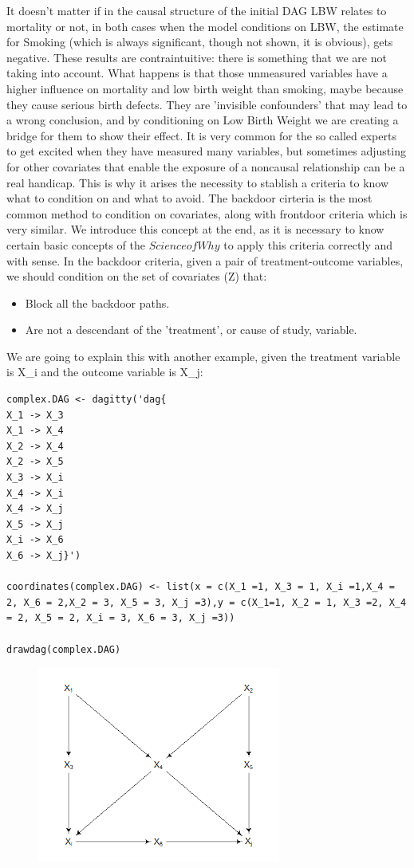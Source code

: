 \documentclass{article}
\begin{document}
It doesn't matter if in the causal structure of the initial DAG LBW relates to mortality or not, in both cases when the model conditions on LBW, the estimate for Smoking (which is always significant, though not shown, it is obvious), gets negative. These results are contraintuitive: there is something that we are not taking into account. 
What happens is that those unmeasured variables have a higher influence on mortality and low birth weight than smoking, maybe because they cause serious birth defects. They are 'invisible confounders' that may lead to a wrong conclusion, and by conditioning on Low Birth Weight we are creating a bridge for them to show their effect.
It is very common for the so called experts to get excited when they have measured many variables, but sometimes adjusting for other covariates that enable the exposure of a non\-causal relationship can be a real handicap. This is why it arises the necessity to stablish a criteria to know what to condition on and what to avoid.
The backdoor cirteria is the most common method to condition on covariates, along with frontdoor criteria which is very similar.
We introduce this concept at the end, as it is necessary to know certain basic concepts of the \(Science of Why\) to apply this criteria correctly and with sense.
In the backdoor criteria, given a pair of treatment-outcome variables, we should condition on the set of covariates (Z) that:
\begin{itemize} \item Block all the backdoor paths. \item Are not a descendant of the 'treatment', or cause of study, variable.\end{itemize}
We are going to explain this with another example, given the treatment variable is X\_i and the outcome variable is X\_j:
\begin{lstlisting}
complex.DAG <- dagitty('dag{
X_1 -> X_3
X_1 -> X_4
X_2 -> X_4
X_2 -> X_5
X_3 -> X_i
X_4 -> X_i
X_4 -> X_j
X_5 -> X_j
X_i -> X_6
X_6 -> X_j}')

coordinates(complex.DAG) <- list(x = c(X_1 =1, X_3 = 1, X_i =1,X_4 = 2, X_6 = 2,X_2 = 3, X_5 = 3, X_j =3),y = c(X_1=1, X_2 = 1, X_3 =2, X_4 = 2, X_5 = 2, X_i = 3, X_6 = 3, X_j =3))

drawdag(complex.DAG)
\end{lstlisting}
\begin{figure}[h]
\includegraphics[width=8cm]{complex.DAG.png}
\centering
\end{figure}
\end{document}
